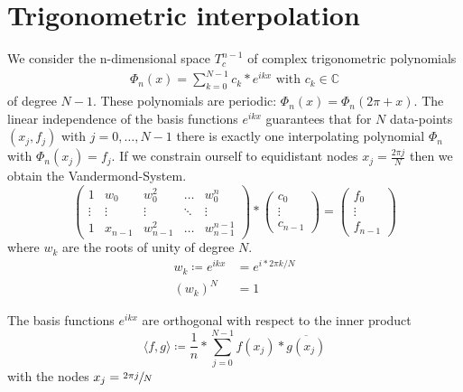 \chapter{Trigonometric interpolation}\label{ch:trigonometric-interpolation}
We consider the n-dimensional space $T_c^{n-1}$ of complex trigonometric polynomials
\begin{align*}
    \Phi_n(x) = \sum_{k=0}^{N-1} c_k * e^{ikx} \text{ with } c_k \in \mathbb{C}
\end{align*}
of degree $N-1$.
These polynomials are periodic: $\Phi_n(x)=\Phi_n(2 \pi + x)$.
The linear independence of the basis functions $e^{ikx}$ guarantees that for $N$ data-points $(x_j, f_j)$ with $j= 0, \ldots, N-1$ there is exactly
one interpolating polynomial $\Phi_n$ with $\Phi_n(x_j)=f_j$.
If we constrain ourself to equidistant nodes $x_j = \frac{2  \pi j}{N}$ then we obtain the Vandermond-System.
\begin{equation*}
    \begin{pmatrix}
        1      & w_0     & w_0^2     & \dots  & w_0^n         \\
        \vdots & \vdots  & \vdots    & \ddots & \vdots        \\
        1      & x_{n-1} & w_{n-1}^2 & \dots  & w_{n-1}^{n-1}
    \end{pmatrix}
    *
    \begin{pmatrix*}
        c_0\\
        \vdots \\
        c_{n-1}
    \end{pmatrix*}
    =
    \begin{pmatrix*}
        f_0\\
        \vdots\\
        f_{n-1}
    \end{pmatrix*}
\end{equation*}
where $w_k$ are the roots of unity of degree $N$.
\begin{align*}
    w_k \coloneq e^{ikx} &= e^{i*2 \pi k / N}\\
    (w_k)^N &= 1
\end{align*}
\begin{lemma}
    The basis functions $e^{ikx}$ are orthogonal with respect to the inner product
    \begin{equation*}
        \langle f, g \rangle \coloneq \frac{1}{n} * \sum_{j=0}^{N-1} f(x_j) * \overline{g(x_j)}
    \end{equation*}
    with the nodes $x_j = \sfrac{2\pi j}{N}$
\end{lemma}
